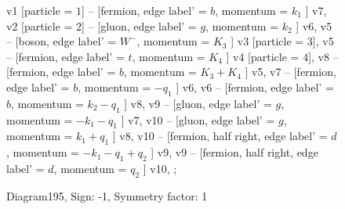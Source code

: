\documentclass{revtex4}
\begin{document}
\begin{figure}[!htb]
\begin{center}
{    %
v1 [particle = \(1\)] -- [fermion, edge label' = \(b\), momentum = \(k_{1}\) ] v7, 
v2 [particle = \(2\)] -- [gluon, edge label' = \(g\), momentum = \(k_{2}\) ] v6, 
v5 -- [boson, edge label' = \(W^{-}\), momentum = \(K_{3}\) ] v3 [particle = \(3\)], 
v5 -- [fermion, edge label' = \(t\), momentum = \(K_{4}\) ] v4 [particle = \(4\)], 
v8 -- [fermion, edge label' = \(b\), momentum = \(K_{3} + K_{4}\) ] v5, 
v7 -- [fermion, edge label' = \(b\), momentum = \(-q_{1}\) ] v6, 
v6 -- [fermion, edge label' = \(b\), momentum = \(k_{2} - q_{1}\) ] v8, 
v9 -- [gluon, edge label' = \(g\), momentum = \(-k_{1} - q_{1}\) ] v7, 
v10 -- [gluon, edge label' = \(g\), momentum = \(k_{1} + q_{1}\) ] v8, 
v10 -- [fermion, half right, edge label' = \(d\), momentum = \(-k_{1} - q_{1} + q_{2}\) ] v9, 
v9 -- [fermion, half right, edge label' = \(d\), momentum = \(q_{2}\) ] v10, 
};
\end{center}
\caption{Diagram195, Sign: -1, Symmetry factor: 1}
\end{figure}
\newpage
\end{document}
